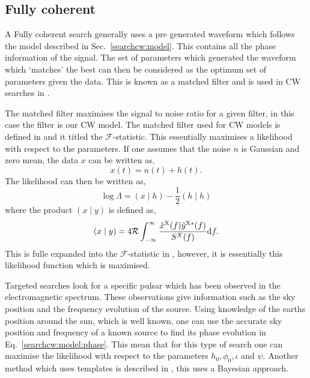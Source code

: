 \subsection{\label{searchcw:search:coherent}Fully coherent}

A Fully coherent search generally uses a pre generated waveform which follows the model described in Sec.~\ref{searchcw:model}. 
This contains all the phase information of the signal.
The set of parameters which generated the waveform which `matches' the best can then be considered as the optimum set of parameters given the data.
This is known as a matched filter \citep{} and is used in \gls{CW} searches in \citep{dupuis2005BayesianEstimation,}.

The matched filter maximises the signal to noise ratio for a given filter, in this case the filter is our \gls{CW} model. 
The matched filter used for \gls{CW} models is defined in \citep{prix2007SearchContinuous} and it titled the $\mathcal{F}$-statistic. 
This essentially maximises a likelihood with respect to the parameters.
If one assumes that the noise $n$ is Gaussian and zero mean, the data $x$ can be written as,
\begin{equation}
		x(t) = n(t) + h(t).
\end{equation}
The likelihood can then be written as,
\begin{equation}
		\log \Lambda = \left( x \mid h \right) - \frac{1}{2} \left( h \mid h\right) 
\end{equation}
where the product $(x \mid y)$ is defined as,
\begin{equation}
		\left( x \mid y \right) = 4 \mathcal{R} \int^{\infty}_{-\infty}  \frac{\tilde{x}^{{\rm X}}(f) \tilde{y}^{{\rm X *}}(f)  }{S^{X}(f)} \mathrm{d}f.
\end{equation}
This is fulle expanded into the $\mathcal{F}$-statistic in \citep{schutz1998DataAnalysis}, however, it is essentially this likelihood function which is maximised. 


Targeted searches look for a specific pulsar which has been observed in the electromagnetic spectrum.
These observations give information such as the sky position and the frequency evolution of the source.
Using knowledge of the earths position around the sun, which is well known, one can use the accurate sky position and frequency of a known source to find its phase evolution in Eq.~\ref{searchcw:model:phase}.
This mean that for this type of search one can maximise the likelihood with respect to the parameters  $h_0, \phi_0, \iota$ and $\psi$.
Another method which uses templates is described in \citep{dupuis2005BayesianEstimation}, this uses a Bayesian approach.

